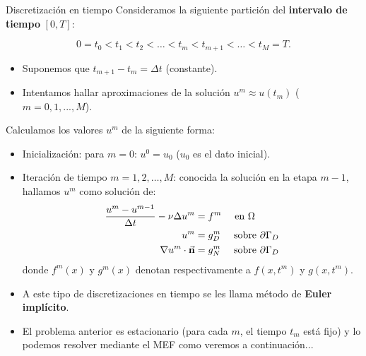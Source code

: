 \documentclass[9pt, dvipsnames,]{beamer}
\begin{document}
\begin{frame}{Discretización en tiempo}
  \small
Consideramos la siguiente partición del \textbf{intervalo de tiempo} $[0,T]$:

$$
0=t_0 < t_1 < t_2 < \dots < t_m < t_{m+1} < \dots  < t_M=T.
$$
\begin{itemize}
  \item Suponemos que $t_{m+1}-t_m = \Delta t$ (constante).
  \item Intentamos hallar aproximaciones de la solución $u^m\approx u(t_m)$ ($m=0,1,...,M$).
\end{itemize}
Calculamos los valores $u^m$ de la siguiente forma:
\begin{itemize}
  \item Inicialización: para $m=0$: $u^0=u_0$ ($u_0$ es el dato inicial).
  \item Iteración de tiempo $m=1,2,\dots,M$: conocida la solución en
    la etapa $m-1$, hallamos $u^m$ como solución de:
    \begin{align}
      \label{eq:1}
     \frac{u^m-u^{m-1}}{\Delta t} - \nu\Delta u^m &= f^m \quad\text{ en } \Omega
     \\
     u^m &= g_D^m \quad\text{ sobre } \partial\Gamma_D
           \\
   \nabla u^m\cdot\vec{\mathbf{n}} &= g_N^m \quad\text{ sobre } \partial\Gamma_D
   \end{align}
   donde $f^m(x)$ y $g^m(x)$ denotan respectivamente a $f(x,t^m)$ y $g(x,t^m)$.
   \item A este tipo de discretizaciones en tiempo se les llama método de \textbf{Euler implícito}.
   \item El problema anterior es estacionario (para cada $m$, el tiempo $t_m$ está fijo) y lo podemos resolver mediante el MEF como veremos a continuación...

\end{itemize}

\end{frame}
\end{document}

